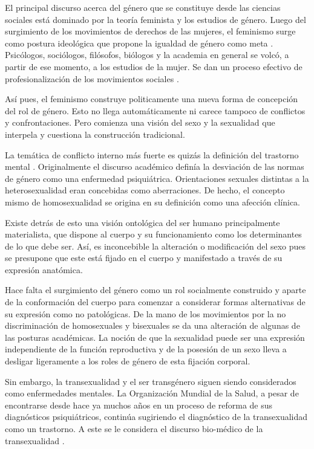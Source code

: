 El principal discurso acerca del género que se constituye desde las ciencias
sociales está dominado por la teoría feminista y los estudios de género. Luego
del surgimiento de los movimientos de derechos de las mujeres, el feminismo
surge como postura ideológica que propone la igualdad de género como meta
\parencite{DeMiguel,Gamb2008,Guardia2013}. Psicólogos, sociólogos, filósofos,
biólogos y la academia en general se volcó, a partir de ese momento, a los
estudios de la mujer. Se dan un proceso efectivo de profesionalización de los
movimientos sociales \parencite{Helfrich2001}.

Así pues, el feminismo construye politicamente una nueva forma de concepción del
rol de género. Esto no llega automáticamente ni carece tampoco de conflictos y
confrontaciones. Pero comienza una visión del sexo y la sexualidad que interpela
y cuestiona la construcción tradicional.

La temática de conflicto interno más fuerte es quizás la definición del
trastorno mental \parencite{APA}. Originalmente el discurso académico definía la
desviación de las normas de género como una enfermedad psiquiátrica.
Orientaciones sexuales distintas a la heterosexualidad eran concebidas como
aberraciones. De hecho, el concepto mismo de homosexualidad se origina en su
definición como una afección clínica.

Existe detrás de esto una visión ontológica del ser humano principalmente
materialista, que dispone al cuerpo y su funcionamiento como los determinantes
de lo que debe ser. Así, es inconcebible la alteración o modificación del sexo
pues se presupone que este está fijado en el cuerpo y manifestado a través de su
expresión anatómica.

Hace falta el surgimiento del género como un rol socialmente construido y aparte
de la conformación del cuerpo para comenzar a considerar formas alternativas de
su expresión como no patológicas. De la mano de los movimientos por la no
discriminación de homosexuales y bisexuales se da una alteración de algunas de
las posturas académicas. La noción de que la sexualidad puede ser una expresión
independiente de la función reproductiva y de la posesión de un sexo lleva a
desligar ligeramente a los roles de género de esta fijación corporal.

Sin embargo, la transexualidad y el ser transgénero siguen siendo considerados
como enfermedades mentales. La Organización Mundial de la Salud, a pesar de
encontrarse desde hace ya muchos años en un proceso de reforma de sus
diagnósticos psiquiátricos, continúa sugiriendo el diagnóstico de la
transexualidad como un trastorno. A este se le considera el discurso bio-médico
de la transexualidad \parencite{Helfrich2001}.

